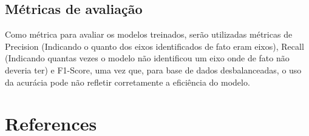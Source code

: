 \documentclass[12pt]{article}
\begin{document}
    \subsection{Métricas de avaliação}
        Como métrica para avaliar os modelos treinados, serão utilizadas métricas de Precision (Indicando o quanto dos eixos identificados de fato eram eixos), Recall (Indicando quantas vezes o modelo não identificou um eixo onde de fato não deveria ter) e F1-Score, uma vez que, para base de dados desbalanceadas, o uso da acurácia pode não refletir corretamente a eficiência do modelo.
    

\section{References}



\end{document}
